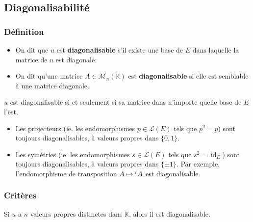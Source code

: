   \subsection{Diagonalisabilité}

  \subsubsection{Définition}


  \begin{definition}
    \begin{itemize}
      \item On dit que $u$ est \textbf{diagonalisable} s'il existe une base de $E$ dans laquelle la matrice de $u$ est diagonale.
      \item On dit qu'une matrice $A \in \mathcal{M}_n(\mathbb{K})$ est \textbf{diagonalisable} si elle est semblable à une matrice diagonale.
    \end{itemize}
  \end{definition}

  \begin{remark}
    $u$ est diagonalisable si et seulement si sa matrice dans n'importe quelle base de $E$ l'est.
  \end{remark}


  \begin{example}
    \begin{itemize}
      \item Les projecteurs (ie. les endomorphismes $p \in \mathcal{L}(E)$ tels que $p^2 = p$) sont toujours diagonalisables, à valeurs propres dans $\{ 0, 1 \}$.
      \item Les symétries (ie. les endomorphismes $s \in \mathcal{L}(E)$ tels que $s^2 = \operatorname{id}_E$) sont toujours diagonalisables, à valeurs propres dans $\{ \pm 1 \}$. Par exemple, l'endomorphisme de transposition $A \mapsto \mathstrut ^t A$ est diagonalisable.
    \end{itemize}
  \end{example}

  \subsubsection{Critères}


  \begin{proposition}
    Si $u$ a $n$ valeurs propres distinctes dans $\mathbb{K}$, alors il est diagonalisable.
  \end{proposition}

